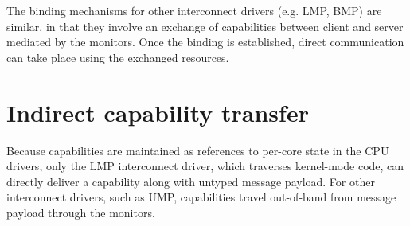 \documentclass[a4paper,twoside]{report} %
\begin{document}
The binding mechanisms for other interconnect drivers (e.g. LMP, BMP) are
similar, in that they involve an exchange of capabilities between client and
server mediated by the monitors. Once the binding is established, direct
communication can take place using the exchanged resources.

\section{Indirect capability transfer}
\label{sec:capxfer}

Because capabilities are maintained as references to per-core state in the
CPU drivers, only the LMP interconnect driver, which traverses kernel-mode
code, can directly deliver a capability along with untyped message payload.
For other interconnect drivers, such as UMP, capabilities travel out-of-band
from message payload through the monitors.
\end{document}
